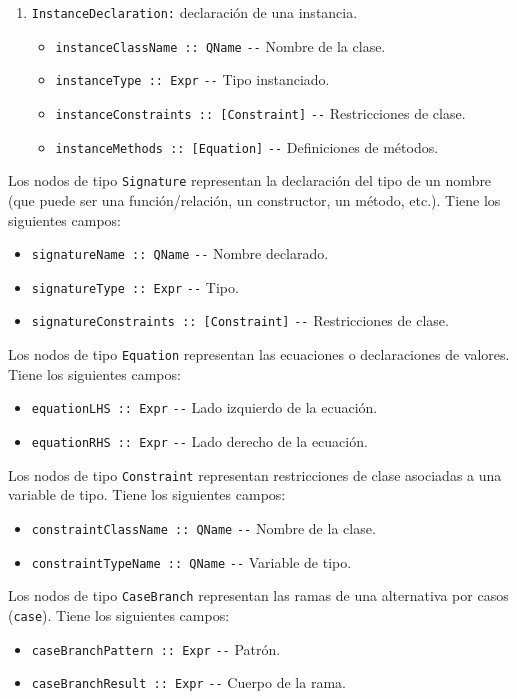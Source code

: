 \begin{enumerate}
  \item \verb|InstanceDeclaration:| declaración de una instancia.
    \begin{itemize}
    \item \verb|instanceClassName :: QName| \hfill \verb|--| Nombre de la clase.
    \item \verb|instanceType :: Expr| \hfill \verb|--| Tipo instanciado.
    \item \verb|instanceConstraints :: [Constraint]| \hfill \verb|--| Restricciones de clase.
    \item \verb|instanceMethods :: [Equation]| \hfill \verb|--| Definiciones de métodos.
    \end{itemize}
\end{enumerate}

Los nodos de tipo \verb|Signature| representan la declaración del tipo
de un nombre (que puede ser una función/relación, un constructor, un
método, etc.). Tiene los siguientes campos:
\begin{itemize}
\item \verb|signatureName :: QName| \hfill \verb|--| Nombre declarado.
\item \verb|signatureType :: Expr| \hfill \verb|--| Tipo.
\item \verb|signatureConstraints :: [Constraint]| \hfill \verb|--| Restricciones de clase.
\end{itemize}

Los nodos de tipo \verb|Equation| representan las ecuaciones
o declaraciones de valores. Tiene los siguientes campos:
\begin{itemize}
\item \verb|equationLHS :: Expr| \hfill \verb|--| Lado izquierdo de la ecuación.
\item \verb|equationRHS :: Expr| \hfill \verb|--| Lado derecho de la ecuación.
\end{itemize}

Los nodos de tipo \verb|Constraint| representan restricciones de clase
asociadas a una variable de tipo. Tiene los siguientes campos:
\begin{itemize}
\item \verb|constraintClassName :: QName| \hfill \verb|--| Nombre de la clase.
\item \verb|constraintTypeName :: QName| \hfill \verb|--| Variable de tipo.
\end{itemize}

Los nodos de tipo \verb|CaseBranch| representan las ramas
de una alternativa por casos (\verb|case|). Tiene los siguientes campos:
\begin{itemize}
\item \verb|caseBranchPattern :: Expr| \hfill \verb|--| Patrón.
\item \verb|caseBranchResult :: Expr| \hfill \verb|--| Cuerpo de la rama.
\end{itemize}

